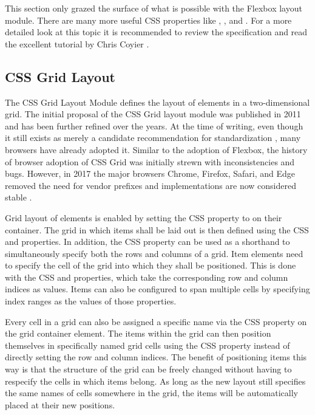 This section only grazed the surface of what is possible with the
Flexbox layout module. There are many more useful CSS properties like
, , and .
For a more detailed look at this topic it is recommended to review the
specification \parencite{CSSFlexbox} and read the excellent tutorial
by Chris Coyier \parencite{Coyier-FlexboxGuide}.





\subsection{CSS Grid Layout}
\label{sec:Grid}

The CSS Grid Layout Module \parencite{CSSGrid} defines the layout of
elements in a two-dimensional grid. The initial proposal of the CSS
Grid layout module was published in 2011 \parencite{CSSGridFirstDraft}
and has been further refined over the years. At the time of writing,
even though it still exists as merely a candidate recommendation for
standardization \parencite{CSSGrid}, many browsers have already
adopted it. Similar to the adoption of Flexbox, the history of browser
adoption of CSS Grid was initially strewn with inconsistencies and
bugs. However, in 2017 the major browsers Chrome, Firefox, Safari, and
Edge removed the need for vendor prefixes and implementations are now
considered stable \parencite{CanIUseCSSGrid}.

Grid layout of elements is enabled by setting the CSS
 property to  on their container. The grid
in which items shall be laid out is then defined using the CSS
 and 
properties. In addition, the CSS  property can
be used as a shorthand to simultaneously specify both the rows and
columns of a grid.
%
Item elements need to specify the cell of the grid into which they
shall be positioned. This is done with the CSS  and
 properties, which take the corresponding row and
column indices as values. Items can also be configured to span
multiple cells by specifying index ranges as the values of those
properties.

Every cell in a grid can also be assigned a specific name via the CSS
 property on the grid container element.
The items within the grid can then position themselves in specifically
named grid cells using the CSS  property instead of
directly setting the row and column indices. The benefit of
positioning items this way is that the structure of the grid can be
freely changed without having to respecify the cells in which items
belong. As long as the new layout still specifies the same names of
cells somewhere in the grid, the items will be automatically placed at
their new positions.

